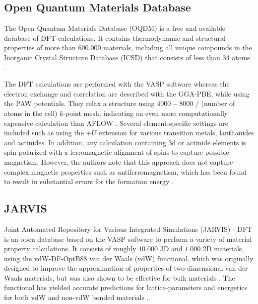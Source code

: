 \subsection{Open Quantum Materials Database}

The Open Quantum Materials Database (OQDM) \cite{Saal2013, Kirklin2015} is a free and available database of DFT-calculations. It contains thermodynamic and structural properties of more than $600.000$ materials, including all unique compounds in the Inorganic Crystal Structure Database (ICSD) that consists of less than $34$ atoms \cite{Ferrenti2020}.

The DFT calculations are performed with the VASP software whereas the electron exchange and correlation are described with the GGA-PBE, while using the PAW potentials. They relax a structure using $4000-8000$ / (number of atoms in the cell) $k$-point mesh, indicating an even more computationally expensive calculation than AFLOW \cite{Ferrenti2020}. Several element-specific settings are included such as using the $+U$ extension for various transition metals, lanthanides and actinides. In addition, any calculation containing 3d or actinide elements is spin-polarized with a ferromagnetic alignment of spins to capture possible magnetism. However, the authors note that this approach does not capture complex magnetic properties such as antiferromagnetism, which has been found to result in substantial errors for the formation energy \cite{Stevanovic2012}.

\subsection{JARVIS}

Joint Automated Repository for Various Integrated Simulations (JARVIS) - DFT \cite{Choudhary2020} is an open database based on the VASP \cite{Kresse1996} software to perform a variety of material property calculations. It consists of roughly $40.000$ 3D and $1.000$ 2D materials using the vdW-DF-OptB88 van der Waals (vdW) functional, which was originally designed to improve the approximation of properties of two-dimensional van der Waals materials, but was also shown to be effective for bulk materials \cite{Thonhauser2007, Klimes2011}. The functional has yielded accurate predictions for lattice-parameters and energetics for both vdW and non-vdW bonded materials  \cite{Choudhary2018}.

